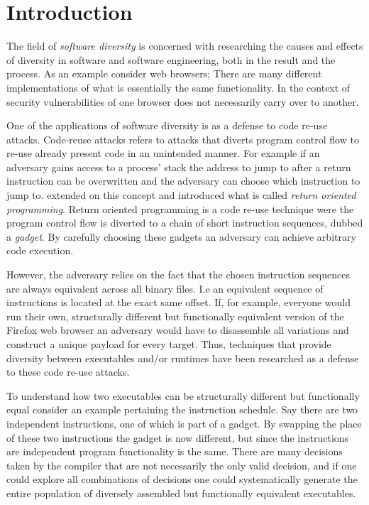 \chapter{Introduction}

The field of \textit{software diversity} is concerned with researching the
causes and effects of diversity in software and software engineering, both in the result
and the process. As an example consider web browsers; There are many different implementations
of what is essentially the same functionality. In the context of security vulnerabilities
of one browser does not necessarily carry over to another\cite{survey}.

One of the applications of software diversity is as a defense to code re-use attacks\cite{survey}.
Code-reuse attacks refers to attacks that diverts program control flow to re-use already
present code in an unintended manner\cite{code-re-use}. For example if an adversary gains
access to a process' stack the address to jump to after a return instruction can be
overwritten and the adversary can choose which instruction to jump to. \textcite{rop}
extended on this concept and introduced what is called \textit{return oriented programming}.
Return oriented programming is a code re-use technique were the program control flow is
diverted to a chain of short instruction sequences, dubbed a \textit{gadget}. By carefully
choosing these gadgets an adversary can achieve arbitrary code execution.

However, the adversary relies on the fact that the chosen instruction sequences are always
equivalent across all binary files. I.e an equivalent sequence of instructions is located
at the exact same offset. If, for example, everyone would run their own, structurally
different but functionally equivalent version of the Firefox web browser an adversary would
have to disassemble all variations and construct a unique payload for every target. Thus,
techniques that provide diversity between executables and/or runtimes have been researched
as a defense to these code re-use attacks\cite{survey}.

To understand how two executables can be structurally different but functionally equal
consider an example pertaining the instruction schedule. Say there are two independent
instructions, one of which is part of a gadget. By swapping the place of these two
instructions the gadget is now different, but since the instructions are independent
program functionality is the same. There are many decisions taken by the compiler that are
not necessarily the only valid decision, and if one could explore all combinations of
decisions one could systematically generate the entire population of diversely assembled
but functionally equivalent executables.

